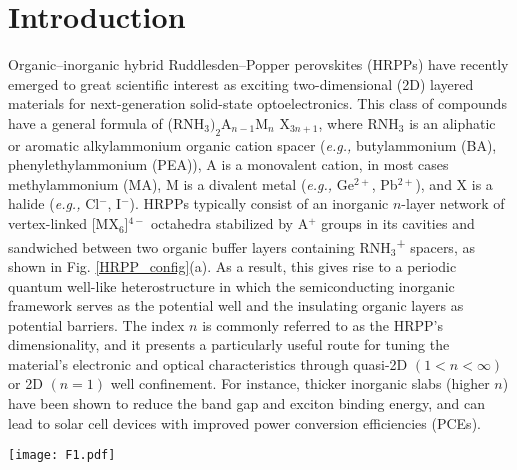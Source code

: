 \documentclass[aps,prl,preprint,11pt,superscriptaddress,bibnotes,amsmath,amssymb,amsfonts,showkeys]{revtex4-2}
\begin{document}

\section{Introduction}
Organic--inorganic hybrid Ruddlesden--Popper perovskites (HRPPs) have recently emerged to great scientific interest as exciting two-dimensional (2D) layered materials for next-generation solid-state optoelectronics.\cite{MHhrpp16,TNhrpp16,CShrpp15,SHhrpp14,KMhrpp99} This class of compounds have a general formula of (RNH$_3)_2$A$_{n-1}$M$_n$ X$_{3n+1}$, where RNH$_3$ is an aliphatic or aromatic alkylammonium organic cation spacer (\textit{e.g.,} butylammonium (BA), phenylethylammonium (PEA)), A is a monovalent cation, in most cases methylammonium (MA), M is a divalent metal (\textit{e.g.,} Ge$^{2+}$, Pb$^{2+}$), and X is a halide (\textit{e.g.,} Cl$^-$, I$^-$). HRPPs typically consist of an inorganic $n$-layer network of vertex-linked [MX$_6$]$^{4-}$ octahedra stabilized by A$^+$ groups in its cavities and sandwiched between two organic buffer layers containing RNH$_3$\textsuperscript{+} spacers, as shown in Fig. \ref{HRPP_config}(a). As a result, this gives rise to a periodic quantum well-like heterostructure in which the semiconducting inorganic framework serves as the potential well and the insulating organic layers as potential barriers.\cite{MTmqw95,HImqw92} The index $n$ is commonly referred to as the HRPP's dimensionality, and it presents a particularly useful route for tuning the material's electronic and optical characteristics through quasi-2D $(1 < n < \infty)$ or 2D $(n = 1)$ well confinement. For instance, thicker inorganic slabs (higher $n$) have been shown to reduce the band gap and exciton binding energy, and can lead to solar cell devices with improved power conversion efficiencies (PCEs).\cite{BAqwell18,GBqwell18,XMqwell17,QYqwell16,SCqwell16}

\begin{figure*}
\texttt{[image: F1.pdf]}
\caption{(a) Schematic of the HRPP crystal structure along the stacking direction. In this example, the inorganic framework consists of three layers of [MX$_6$]$^{4-}$ octahedra (\textit{i.e.,} $n = 3$). (b) Crystal structure of monolayer (BA)$_2$PbI$_4$ (C, grey; H, pink; N, blue; Pb, orange; I, purple), with the orthorhombic unit cell (shaded pink) indicated in the top ($xy$) view. (c) Atomic configurations of the organic BA molecule and inorganic [PbI$_6$]$^{4-}$ octahedron that constitute the (BA)$_2$PbI$_4$ perovskite. (d) Schematic of the octahedra tilt system (top view) in monolayer (BA)$_2$PbI$_4$, with the orthorhombic unit cell indicated by dashed lines. (e) Construction of (BA)$_2$PbI$_4$ nanoribbons with identical edges along the two fundamental lattice directions. \label{HRPP_config}}
\end{figure*}
\end{document}
